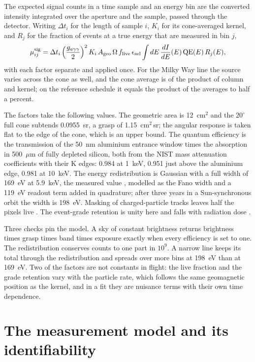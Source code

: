 \documentclass[11pt]{article}
\newcommand{\gag}{g_{a\gamma\gamma}}
\begin{document}
The expected signal counts in a time sample and an energy bin are the converted intensity integrated over the aperture and the sample, passed through the detector. Writing $\Delta t_i$ for the length of sample $i$, $K_i$ for its cone-averaged kernel, and $R_j$ for the fraction of events at a true energy that are measured in bin $j$,
\begin{equation}
\mu^{\rm sig}_{ij}=\Delta t_i\left(\frac{\gag}{2}\right)^{2}K_i\,A_{\rm geo}\,\Omega\,f_{\rm live}\,\epsilon_{\rm sel}\int dE\,\frac{dI}{dE}(E)\,{\rm QE}(E)\,R_j(E),
\label{eq:counts}
\end{equation}
with each factor separate and applied once. For the Milky Way line the source varies across the cone as well, and the cone average is of the product of column and kernel; on the reference schedule it equals the product of the averages to half a percent.

The factors take the following values. The geometric area is 12~cm$^2$ and the $20^\circ$ full cone subtends 0.0955~sr, a grasp of 1.15~cm$^2$\,sr; the angular response is taken flat to the edge of the cone, which is an upper bound. The quantum efficiency is the transmission of the 50~nm aluminium entrance window times the absorption in 500~$\mu$m of fully depleted silicon, both from the NIST mass attenuation coefficients with their K edges: 0.984 at 1~keV, 0.951 just above the aluminium edge, 0.981 at 10~keV. The energy redistribution is Gaussian with a full width of 169~eV at 5.9~keV, the measured value \citep{alpine2026xray}, modelled as the Fano width and a 119~eV readout term added in quadrature; after three years in a Sun-synchronous orbit the width is 198~eV. Masking of charged-particle tracks leaves half the pixels live \citep{alpine2025darkness}. The event-grade retention is unity here and falls with radiation dose \citep{cervantesvergara2025proton,alpine2026xray}.

Three checks pin the model. A sky of constant brightness returns brightness times grasp times band times exposure exactly when every efficiency is set to one. The redistribution conserves counts to one part in $10^{9}$. A narrow line keeps its total through the redistribution and spreads over more bins at 198~eV than at 169~eV. Two of the factors are not constants in flight: the live fraction and the grade retention vary with the particle rate, which follows the same geomagnetic position as the kernel, and in a fit they are nuisance terms with their own time dependence.

\section{The measurement model and its identifiability}
\label{sec:likelihood}
\end{document}
